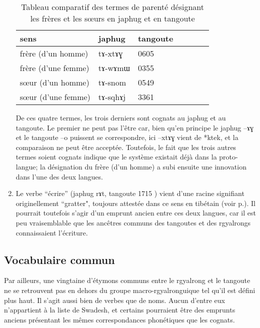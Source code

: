 \documentclass[oldfontcommands,twoside,a4paper,11pt,draft]{memoir}
\newcommand{\ipa}[1]{{\phon #1}} %
\newcommand{\tgz}[1]{#1 \mo{#1} \tg{#1}}
\newcommand{\jpg}[1]{japhug \ipa{#1}\index{Japhug!#1}}
\begin{document}
\begin{enumerate}
  \begin{table}
  \caption{Tableau comparatif des termes de parenté désignant les frères et les sœurs en japhug et en tangoute} \centering
\begin{tabular}{lllllll}
\toprule
sens & japhug & tangoute \\
\midrule
frère (d'un homme) & \ipa{tɤ-xtɤɣ} & \tgz{0605}\\
frère (d'une femme) & \ipa{tɤ-wɤmɯ} & \tgz{0355}\\
sœur (d'un homme) & \ipa{tɤ-snom} & \tgz{0549}\\
sœur  (d'une femme) & \ipa{tɤ-sqhɤj} & \tgz{3361}\\
\bottomrule
\end{tabular}
\end{table}
  
De ces quatre termes, les trois derniers sont cognats au japhug et au tangoute. Le premier ne peut pas l'être car, bien qu'en principe le japhug \ipa{--ɤɣ} et le tangoute \ipa{--o} puissent se correspondre, ici \ipa{--xtɤɣ} vient de *ktek, et la comparaison ne peut être acceptée. Toutefois, le fait que les trois autres termes soient cognats indique que le système existait déjà dans la proto-langue; la désignation du frère (d'un homme) a subi ensuite une innovation dans l'une des deux langues. 


  
  
  \item Le verbe ``écrire'' (\jpg{rɤt}, tangoute \tgz{1715}) vient d'une racine signifiant originellement  ``gratter", toujours attestée dans ce sens en tibétain (voir p.\pageref{analyse:ecrire}).  Il pourrait toutefois s'agir d'un emprunt ancien entre ces deux langues, car il est peu vraisemblable que   les ancêtres communs des tangoutes et des rgyalrongs connaissaient l'écriture.
 \end{enumerate}

\subsection{Vocabulaire commun}
Par ailleurs, une vingtaine d'étymons communs entre le rgyalrong et le tangoute ne se retrouvent pas en dehors du groupe macro-rgyalronguique tel qu'il est défini plus haut. Il s'agit aussi bien de verbes que de noms. Aucun d'entre eux n'appartient à la liste de Swadesh, et certains pourraient être des emprunts anciens présentant les mêmes correspondances phonétiques que les cognats.
\end{document}
